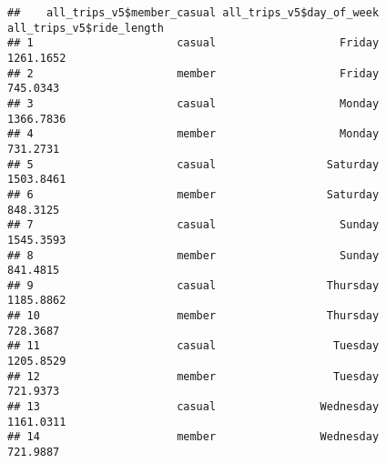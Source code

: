 \documentclass[
]{article}
\newenvironment{Shaded}{\begin{snugshade}}{\end{snugshade}}
\newcommand{\AttributeTok}[1]{\textcolor[rgb]{0.77,0.63,0.00}{#1}}
\newcommand{\CommentTok}[1]{\textcolor[rgb]{0.56,0.35,0.01}{\textit{#1}}}
\newcommand{\FunctionTok}[1]{\textcolor[rgb]{0.00,0.00,0.00}{#1}}
\newcommand{\NormalTok}[1]{#1}
\newcommand{\OtherTok}[1]{\textcolor[rgb]{0.56,0.35,0.01}{#1}}
\newcommand{\SpecialCharTok}[1]{\textcolor[rgb]{0.00,0.00,0.00}{#1}}
\newcommand{\StringTok}[1]{\textcolor[rgb]{0.31,0.60,0.02}{#1}}
\begin{document}
\begin{verbatim}
##    all_trips_v5$member_casual all_trips_v5$day_of_week all_trips_v5$ride_length
## 1                      casual                   Friday                1261.1652
## 2                      member                   Friday                 745.0343
## 3                      casual                   Monday                1366.7836
## 4                      member                   Monday                 731.2731
## 5                      casual                 Saturday                1503.8461
## 6                      member                 Saturday                 848.3125
## 7                      casual                   Sunday                1545.3593
## 8                      member                   Sunday                 841.4815
## 9                      casual                 Thursday                1185.8862
## 10                     member                 Thursday                 728.3687
## 11                     casual                  Tuesday                1205.8529
## 12                     member                  Tuesday                 721.9373
## 13                     casual                Wednesday                1161.0311
## 14                     member                Wednesday                 721.9887
\end{verbatim}

\begin{Shaded}
\end{Shaded}
\end{document}
